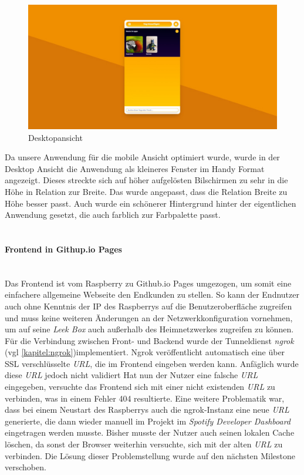\documentclass[10pt, a4paper]{article}
\begin{document}
\begin{onehalfspace}
\begin{figure}[ht]
  \includegraphics[width=\textwidth]{HomescreenDesktop.jpeg}
    \caption{Desktopansicht}
    \label{fig1}
\end{figure}
Da unsere Anwendung für die mobile Ansicht optimiert wurde, wurde in der Desktop Ansicht die Anwendung als kleineres Fenster im Handy Format angezeigt.
Dieses streckte sich auf höher aufgelösten Bilschirmen zu sehr in die Höhe in Relation zur Breite.
Das wurde angepasst, dass die Relation Breite zu Höhe besser passt.
Auch wurde ein schönerer Hintergrund hinter der eigentlichen Anwendung gesetzt, die auch farblich zur Farbpalette passt.
\\~\\
\paragraph*{Frontend in Githup.io Pages} $~$ \\
Das Frontend ist vom Raspberry zu Github.io Pages umgezogen, um somit eine einfachere allgemeine Webseite den Endkunden zu stellen.
So kann der Endnutzer auch ohne Kenntnis der IP des Raspberrys auf die Benutzeroberfläche zugreifen
und muss keine weiteren Änderungen an der Netzwerkkonfiguration vornehmen, um auf seine \textit{Leek Box} auch außerhalb des Heimnetzwerkes zugreifen zu können.
Für die Verbindung zwischen Front- und Backend wurde der Tunneldienst \textit{ngrok} (vgl \ref{kapitel:ngrok})implementiert.
Ngrok veröffentlicht automatisch eine über SSL verschlüsselte \textit{URL}, die im Frontend eingeben werden kann.
Anfäglich wurde diese \textit{URL} jedoch nicht validiert
Hat nun der Nutzer eine falsche \textit{URL} eingegeben, versuchte das Frontend sich mit einer nicht existenden \textit{URL} zu verbinden, was in einem Fehler 404 resultierte.
Eine weitere Problematik war, dass bei einem Neustart des Raspberrys auch die ngrok-Instanz eine neue \textit{URL} generierte, die dann wieder manuell im Projekt im \textit{Spotify Developer Dashboard} eingetragen werden musste.
Bisher musste der Nutzer auch seinen lokalen Cache löschen, da sonst der Browser weiterhin versuchte, sich mit der alten \textit{URL} zu verbinden.
Die Lösung dieser Problemstellung wurde auf den nächsten Milestone verschoben.
\\~\\

\end{onehalfspace}
\end{document}
